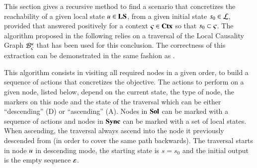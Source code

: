 This section gives a recursive method to find a scenario that concretizes
the reachability of a given local state $u \in \mathbf{LS}$,
from a given initial state $s_0 \in \mathcal{L}$,
provided that  answered positively
for a context $\varsigma \in \mathbf{Ctx}$ so that $s_0 \subset \varsigma$.
The algorithm proposed in the following relies on a traversal of the Local Causality Graph
${\mathcal{B}_{\varsigma}^{u}}$ that has been used for this conclusion.
The correctness of this extraction can be demonstrated
in the same fashion as .

This algorithm consists in visiting all required nodes in a given order,
to build a sequence of actions that concretizes the objective.
The actions to perform on a given node,
listed below,
depend on the current state, the type of node, the markers on this node
and the state of the traversal which can be either “descending” (D) or “ascending” (A).
Nodes in $\mathbf{Sol}$ can be marked with a sequence of actions
and nodes in $\mathbf{Sync}$ can be marked with a set of local states.
When ascending, the traversal always ascend into the node it previously descended from
(in order to cover the same path backwards).
The traversal starts in node $u$ in descending mode,
the starting state is $s = s_0$
and the initial output is the empty sequence $\varepsilon$.

